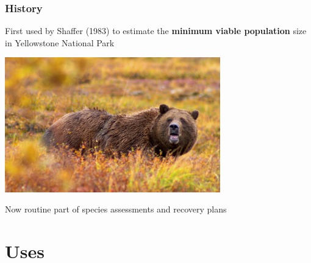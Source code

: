 \documentclass[color=usenames,dvipsnames]{beamer}\usepackage[]{graphicx}\usepackage[]{color}
\begin{document}
\begin{frame}
  \frametitle{History}
  First used by Shaffer (1983) to estimate the {\bf minimum viable
    population} size in Yellowstone National Park
  \begin{center}
    \includegraphics[width=0.7\textwidth]{figs/Grizzly_Denali}
  \end{center}
  \pause
  \centering
  Now routine part of species assessments and recovery plans \\
\end{frame}






\section{Uses}
\end{document}
